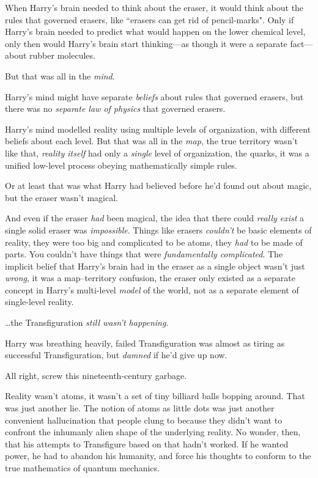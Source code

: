 When Harry's brain needed to think about the eraser, it would think about the rules that governed erasers, like ``erasers can get rid of pencil-marks". Only if Harry's brain needed to predict what would happen on the lower chemical level, only then would Harry's brain start thinking—as though it were a separate fact—about rubber molecules.

But that was all in the \emph{mind}.

Harry's mind might have separate \emph{beliefs} about rules that governed erasers, but there was no \emph{separate law of physics} that governed erasers.

Harry's mind modelled reality using multiple levels of organization, with different beliefs about each level. But that was all in the \emph{map}, the true territory wasn't like that, \emph{reality itself} had only a \emph{single} level of organization, the quarks, it was a unified low-level process obeying mathematically simple rules.

Or at least that was what Harry had believed before he'd found out about magic, but the eraser wasn't magical.

And even if the eraser \emph{had} been magical, the idea that there could \emph{really exist} a single solid eraser was \emph{impossible}. Things like erasers \emph{couldn't} be basic elements of reality, they were too big and complicated to be atoms, they \emph{had} to be made of parts. You couldn't have things that were \emph{fundamentally complicated}. The implicit belief that Harry's brain had in the eraser as a single object wasn't just \emph{wrong}, it was a map--territory confusion, the eraser only existed as a separate concept in Harry's multi-level \emph{model} of the world, not as a separate element of single-level reality.

{\ldots}the Transfiguration \emph{still wasn't happening}.

Harry was breathing heavily, failed Transfiguration was almost as tiring as successful Transfiguration, but \emph{damned} if he'd give up now.

All right, screw this nineteenth-century garbage.

Reality wasn't atoms, it wasn't a set of tiny billiard balls bopping around. That was just another lie. The notion of atoms as little dots was just another convenient hallucination that people clung to because they didn't want to confront the inhumanly alien shape of the underlying reality. No wonder, then, that his attempts to Transfigure based on that hadn't worked. If he wanted power, he had to abandon his humanity, and force his thoughts to conform to the true mathematics of quantum mechanics.

